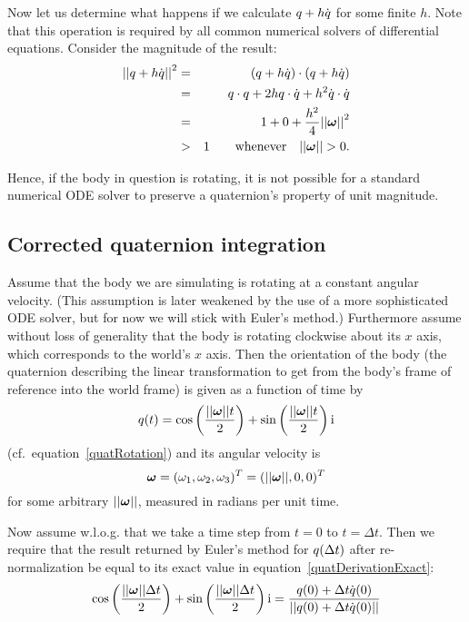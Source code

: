 Now let us determine what happens if we calculate $\mbox{$q$} + h\dot{\mbox{$q$}}$ for some finite $h$.
Note that this operation is required by all common numerical solvers of differential equations.
Consider the magnitude of the result:
\begin{eqnarray*}
\norm{\q{q} + h\dot{\q{q}}}^2 & = & (\q{q} + h\dot{\q{q}})\cdot(\q{q} + h\dot{\q{q}}) \\
&=& \q{q}\cdot\q{q} + 2h\q{q}\cdot\dot{\q{q}} + h^2\dot{\q{q}}\cdot\dot{\q{q}} \\
&=& 1 + 0 + \frac{h^2}{4}\norm{\ve{\omega}}^2 \\
&>& 1 \quad\quad\mbox{whenever}\quad \norm{\ve{\omega}} > 0.
\end{eqnarray*}

Hence, if the body in question is rotating, it is not possible for a standard numerical ODE solver
to preserve a quaternion's property of unit magnitude.

\subsection{Corrected quaternion integration\label{quatIntegrationDerivation}}

Assume that the body we are simulating is rotating at a constant angular velocity.
(This assumption is later weakened by the use of a more sophisticated ODE solver,
but for now we will stick with Euler's method.) Furthermore assume without loss of
generality that the body is rotating clockwise about its $x$ axis, which corresponds
to the world's $x$ axis. Then the orientation of the body (the quaternion describing
the linear transformation to get from the body's frame of reference into the world
frame) is given as a function of time by
\begin{equation}
\label{quatDerivationExact}
\q{q}(t) = \cos\left(\frac{\norm{\ve{\omega}}t}{2}\right) +
    \sin\left(\frac{\norm{\ve{\omega}}t}{2}\right)\qi
\end{equation}
(cf.\ equation~\ref{quatRotation}) and its angular velocity is
\begin{equation}
\ve{\omega} = (\omega_1, \omega_2, \omega_3)^T = (\norm{\ve{\omega}}, 0, 0)^T
\end{equation}
for some arbitrary $\norm{\ve{\omega}}$, measured in radians per unit time.

Now assume w.l.o.g. that we take a time step from $t = 0$ to $t = \Delta t$.
Then we require that the result returned by Euler's method for $\mbox{$q$}(\Delta t)$
after re-normalization be equal to its exact value in equation~\ref{quatDerivationExact}:
\begin{equation}
\label{quatDerivationSetup}
\cos\left(\frac{\norm{\ve{\omega}}\Delta t}{2}\right) +
    \sin\left(\frac{\norm{\ve{\omega}}\Delta t}{2}\right)\qi =
    \frac{\q{q}(0) + \Delta t \dot{\q{q}}(0)}
        {\norm{\q{q}(0) + \Delta t \dot{\q{q}}(0)}}
\end{equation}

